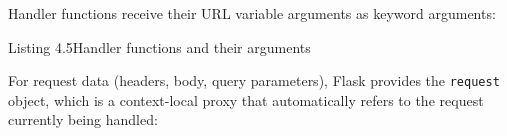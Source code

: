 Handler functions receive their URL variable arguments as keyword arguments:

\begin{codeboxcap}[short]{\textcolor{accent}{Listing 4.5}\enspace Handler functions and their arguments}

\begin{Shaded}
\begin{Highlighting}[]
\NormalTok{(}\OperatorTok{=}\NormalTok{[}\NormalTok{])}
    \NormalTok{(}\SpecialCharTok{\{}\SpecialCharTok{\}}\SpecialCharTok{\{}\SpecialCharTok{\}}\NormalTok{)}
\end{Highlighting}
\end{Shaded}

\end{codeboxcap}

\noindent{}For request data (headers, body, query parameters), Flask provides the \texttt{request} object, which is a context-local proxy that automatically refers to the request currently being handled:

